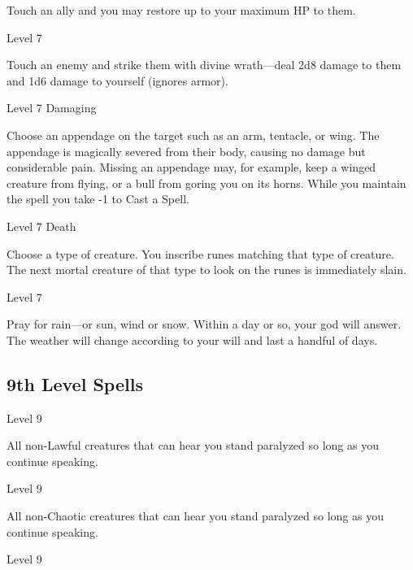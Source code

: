 Touch an ally and you may restore up to your maximum HP to them.

       
\startSpellName
          	Level 7
\stopSpellName
       

Touch an enemy and strike them with divine wrath—deal 2d8 damage to them and 1d6 damage to yourself (ignores armor).

       
\startSpellName
          	Level 7	Damaging
\stopSpellName
       

Choose an appendage on the target such as an arm, tentacle, or wing. The appendage is magically severed from their body, causing no damage but considerable pain. Missing an appendage may, for example, keep a winged creature from flying, or a bull from goring you on its horns. While you maintain the spell you take -1 to Cast a Spell.

       
\startSpellName
          	Level 7	Death
\stopSpellName
       

Choose a type of creature. You inscribe runes matching that type of creature. The next mortal creature of that type to look on the runes is immediately slain.

       
\startSpellName
          	Level 7
\stopSpellName
       

Pray for rain—or sun, wind or snow. Within a day or so, your god will answer. The weather will change according to your will and last a handful of days.

     

     

       
\subsection{9th Level Spells}     
       
\startSpellName
          	Level 9
\stopSpellName
       

All non-Lawful creatures that can hear you stand paralyzed so long as you continue speaking.

       
\startSpellName
          	Level 9
\stopSpellName
       

All non-Chaotic creatures that can hear you stand paralyzed so long as you continue speaking.

       
\startSpellName
          	Level 9
\stopSpellName
       

